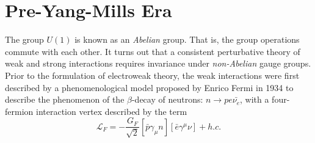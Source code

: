 \section{Pre-Yang-Mills Era}

The group $U(1)$ is known as an \emph{Abelian} group. That is, the group operations commute with each other. It turns out that a consistent perturbative theory of weak and strong interactions requires invariance under \emph{non-Abelian} gauge groups. Prior to the formulation of electroweak theory, the weak interactions were first described by a phenomenological model proposed by Enrico Fermi in 1934 \citep{Fermi:1934sk,Fermi:1934hr} to describe the phenomenon of the $\beta$-decay of neutrons: $n\rightarrow p e \bar{\nu_e}$, with a four-fermion interaction vertex described by the term
\begin{equation}
\mathcal{L}_F = -\frac{G_F}{\sqrt{2}}\left[\bar{p}\gamma_\mu n\right]\left[\bar{e}\gamma^\mu\nu\right] + h.c.
\end{equation}

